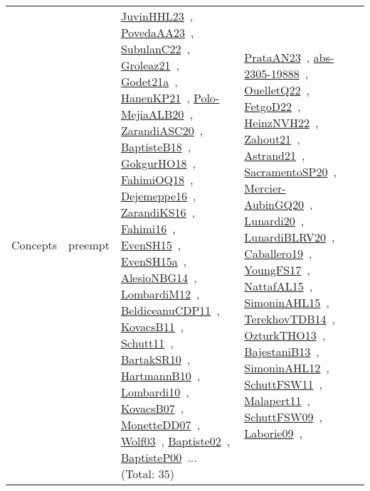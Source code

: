 {\begin{longtable}{lp{3cm}>{\raggedright\arraybackslash}p{6cm}>{\raggedright\arraybackslash}p{6cm}>{\raggedright\arraybackslash}p{8cm}}
Concepts & preempt & \href{works/JuvinHHL23.pdf}{JuvinHHL23}~\cite{JuvinHHL23}, \href{works/PovedaAA23.pdf}{PovedaAA23}~\cite{PovedaAA23}, \href{works/SubulanC22.pdf}{SubulanC22}~\cite{SubulanC22}, \href{works/Groleaz21.pdf}{Groleaz21}~\cite{Groleaz21}, \href{works/Godet21a.pdf}{Godet21a}~\cite{Godet21a}, \href{works/HanenKP21.pdf}{HanenKP21}~\cite{HanenKP21}, \href{works/Polo-MejiaALB20.pdf}{Polo-MejiaALB20}~\cite{Polo-MejiaALB20}, \href{works/ZarandiASC20.pdf}{ZarandiASC20}~\cite{ZarandiASC20}, \href{works/BaptisteB18.pdf}{BaptisteB18}~\cite{BaptisteB18}, \href{works/GokgurHO18.pdf}{GokgurHO18}~\cite{GokgurHO18}, \href{works/FahimiOQ18.pdf}{FahimiOQ18}~\cite{FahimiOQ18}, \href{works/Dejemeppe16.pdf}{Dejemeppe16}~\cite{Dejemeppe16}, \href{works/ZarandiKS16.pdf}{ZarandiKS16}~\cite{ZarandiKS16}, \href{works/Fahimi16.pdf}{Fahimi16}~\cite{Fahimi16}, \href{works/EvenSH15.pdf}{EvenSH15}~\cite{EvenSH15}, \href{works/EvenSH15a.pdf}{EvenSH15a}~\cite{EvenSH15a}, \href{works/AlesioNBG14.pdf}{AlesioNBG14}~\cite{AlesioNBG14}, \href{works/LombardiM12.pdf}{LombardiM12}~\cite{LombardiM12}, \href{works/BeldiceanuCDP11.pdf}{BeldiceanuCDP11}~\cite{BeldiceanuCDP11}, \href{works/KovacsB11.pdf}{KovacsB11}~\cite{KovacsB11}, \href{works/Schutt11.pdf}{Schutt11}~\cite{Schutt11}, \href{works/BartakSR10.pdf}{BartakSR10}~\cite{BartakSR10}, \href{works/HartmannB10.pdf}{HartmannB10}~\cite{HartmannB10}, \href{works/Lombardi10.pdf}{Lombardi10}~\cite{Lombardi10}, \href{works/KovacsB07.pdf}{KovacsB07}~\cite{KovacsB07}, \href{works/MonetteDD07.pdf}{MonetteDD07}~\cite{MonetteDD07}, \href{works/Wolf03.pdf}{Wolf03}~\cite{Wolf03}, \href{works/Baptiste02.pdf}{Baptiste02}~\cite{Baptiste02}, \href{works/BaptisteP00.pdf}{BaptisteP00}~\cite{BaptisteP00}... (Total: 35) & \href{works/PrataAN23.pdf}{PrataAN23}~\cite{PrataAN23}, \href{works/abs-2305-19888.pdf}{abs-2305-19888}~\cite{abs-2305-19888}, \href{works/OuelletQ22.pdf}{OuelletQ22}~\cite{OuelletQ22}, \href{works/FetgoD22.pdf}{FetgoD22}~\cite{FetgoD22}, \href{works/HeinzNVH22.pdf}{HeinzNVH22}~\cite{HeinzNVH22}, \href{works/Zahout21.pdf}{Zahout21}~\cite{Zahout21}, \href{works/Astrand21.pdf}{Astrand21}~\cite{Astrand21}, \href{works/SacramentoSP20.pdf}{SacramentoSP20}~\cite{SacramentoSP20}, \href{works/Mercier-AubinGQ20.pdf}{Mercier-AubinGQ20}~\cite{Mercier-AubinGQ20}, \href{works/Lunardi20.pdf}{Lunardi20}~\cite{Lunardi20}, \href{works/LunardiBLRV20.pdf}{LunardiBLRV20}~\cite{LunardiBLRV20}, \href{works/Caballero19.pdf}{Caballero19}~\cite{Caballero19}, \href{works/YoungFS17.pdf}{YoungFS17}~\cite{YoungFS17}, \href{works/NattafAL15.pdf}{NattafAL15}~\cite{NattafAL15}, \href{works/SimoninAHL15.pdf}{SimoninAHL15}~\cite{SimoninAHL15}, \href{works/TerekhovTDB14.pdf}{TerekhovTDB14}~\cite{TerekhovTDB14}, \href{works/OzturkTHO13.pdf}{OzturkTHO13}~\cite{OzturkTHO13}, \href{works/BajestaniB13.pdf}{BajestaniB13}~\cite{BajestaniB13}, \href{works/SimoninAHL12.pdf}{SimoninAHL12}~\cite{SimoninAHL12}, \href{works/SchuttFSW11.pdf}{SchuttFSW11}~\cite{SchuttFSW11}, \href{works/Malapert11.pdf}{Malapert11}~\cite{Malapert11}, \href{works/SchuttFSW09.pdf}{SchuttFSW09}~\cite{SchuttFSW09}, \href{works/Laborie09.pdf}{Laborie09}~\cite{Laborie09}, 
\end{longtable}}
